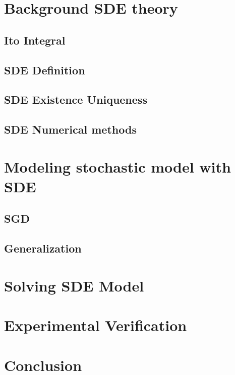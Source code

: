 \documentclass[12pt]{article}
\theoremstyle{definition}
\numberwithin{equation}{section}
\begin{document}
\section{Background SDE theory}
\label{sec:BackgroundSDETheory}
\subsection{Ito Integral}
\label{subsec:ItoIntegral}
\subsection{SDE Definition}
\label{subsec:SDEDefinition}
\subsection{SDE Existence Uniqueness}
\label{subsec:SDEExistenceUniqueness}
\subsection{SDE Numerical methods}

\section{Modeling stochastic model with SDE}
\subsection{SGD}
\subsection{Generalization}
\section{Solving SDE Model}
\section{Experimental Verification}
\section{Conclusion}
\printbibliography
\end{document}
